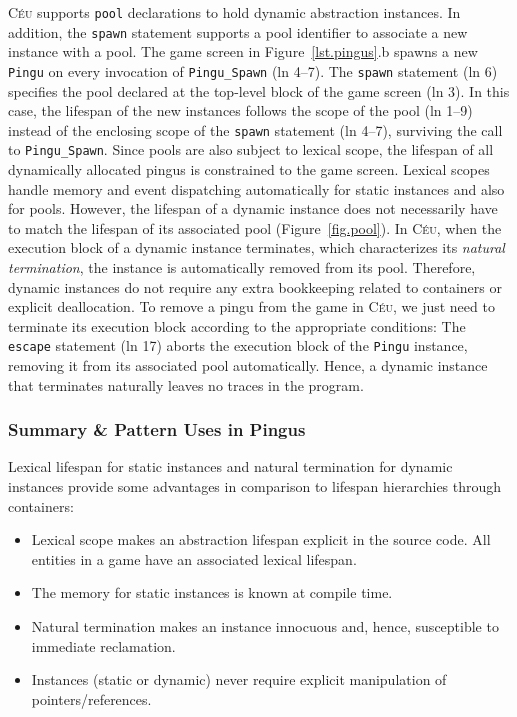 \documentclass[10pt, conference, compsocconf]{IEEEtran}
\newcommand{\CEU}{\textsc{C\'{e}u}\xspace}
\newcommand{\code}[1] {{\small{\texttt{#1}}}}
\begin{document}
\CEU supports \code{pool} declarations to hold dynamic abstraction instances.
In addition, the \code{spawn} statement supports a pool identifier to associate
a new instance with a pool.
%
The game screen in Figure~\ref{lst.pingus}.b spawns a new \code{Pingu} on every
invocation of \code{Pingu\_Spawn} (ln 4--7).
%
The \code{spawn} statement (ln 6) specifies the pool declared at the top-level
block of the game screen (ln 3).
In this case, the lifespan of the new instances follows the scope of the pool
(ln 1--9) instead of the enclosing scope of the \code{spawn} statement
(ln 4--7), surviving the call to \code{Pingu\_Spawn}.
Since pools are also subject to lexical scope, the lifespan of all dynamically
allocated pingus is constrained to the game screen.
%
Lexical scopes handle memory and event dispatching automatically for static
instances and also for pools.
However, the lifespan of a dynamic instance does not necessarily have to match
the lifespan of its associated pool (Figure~\ref{fig.pool}).
In \CEU, when the execution block of a dynamic instance terminates, which
characterizes its \emph{natural termination}, the instance is automatically
removed from its pool.
Therefore, dynamic instances do not require any extra bookkeeping related to 
containers or explicit deallocation.
%
To remove a pingu from the game in \CEU, we just need to terminate its execution
block according to the appropriate conditions:
%
The \code{escape} statement (ln 17) aborts the execution block of the
\code{Pingu} instance, removing it from its associated pool automatically.
Hence, a dynamic instance that terminates naturally leaves no traces in the 
program.

\subsubsection{Summary \& Pattern Uses in Pingus}

Lexical lifespan for static instances and natural termination for dynamic
instances provide some advantages in comparison to lifespan hierarchies through
containers:

\begin{itemize}
\item Lexical scope makes an abstraction lifespan explicit in the source code.
      All entities in a game have an associated lexical lifespan.
\item The memory for static instances is known at compile time.
\item Natural termination makes an instance innocuous and, hence, susceptible
      to immediate reclamation.
\item Instances (static or dynamic) never require explicit manipulation of
      pointers/references.
\end{itemize}
\end{document}

